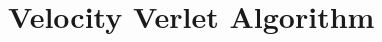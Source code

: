 \documentclass[12pt,a4paper]{article}	%
\newcommand{\x}{\textbf}
\begin{document}
%




\tableofcontents %
\thispagestyle{empty}
\newpage


\section{Velocity Verlet Algorithm}
\end{document}
